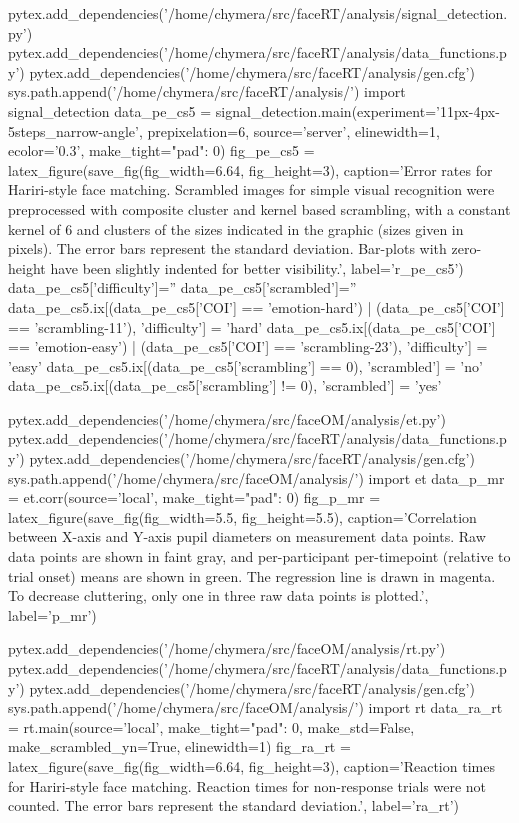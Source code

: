 \begin{pycode}[pe_cs5]
pytex.add_dependencies('/home/chymera/src/faceRT/analysis/signal_detection.py')
pytex.add_dependencies('/home/chymera/src/faceRT/analysis/data_functions.py')
pytex.add_dependencies('/home/chymera/src/faceRT/analysis/gen.cfg')
sys.path.append('/home/chymera/src/faceRT/analysis/')
import signal_detection
data_pe_cs5 = signal_detection.main(experiment='11px-4px-5steps_narrow-angle', prepixelation=6, source='server', elinewidth=1, ecolor='0.3', make_tight={"pad": 0})
fig_pe_cs5 = latex_figure(save_fig(fig_width=6.64, fig_height=3), caption='Error rates for Hariri-style face matching. Scrambled images for simple visual recognition were preprocessed with composite cluster and kernel based scrambling, with a constant kernel of \SI{6}{\pixel} and clusters of the sizes indicated in the graphic (sizes given in pixels). The error bars represent the standard deviation. Bar-plots with zero-height have been slightly indented for better visibility.', label='r_pe_cs5')
data_pe_cs5['difficulty']=''
data_pe_cs5['scrambled']=''
data_pe_cs5.ix[(data_pe_cs5['COI'] == 'emotion-hard') | (data_pe_cs5['COI'] == 'scrambling-11'), 'difficulty'] = 'hard'
data_pe_cs5.ix[(data_pe_cs5['COI'] == 'emotion-easy') | (data_pe_cs5['COI'] == 'scrambling-23'), 'difficulty'] = 'easy'
data_pe_cs5.ix[(data_pe_cs5['scrambling'] == 0), 'scrambled'] = 'no'
data_pe_cs5.ix[(data_pe_cs5['scrambling'] != 0), 'scrambled'] = 'yes'
\end{pycode}
\begin{pycode}[p_mr]
pytex.add_dependencies('/home/chymera/src/faceOM/analysis/et.py')
pytex.add_dependencies('/home/chymera/src/faceRT/analysis/data_functions.py')
pytex.add_dependencies('/home/chymera/src/faceRT/analysis/gen.cfg')
sys.path.append('/home/chymera/src/faceOM/analysis/')
import et
data_p_mr = et.corr(source='local', make_tight={"pad": 0})
fig_p_mr = latex_figure(save_fig(fig_width=5.5, fig_height=5.5), caption='Correlation between X-axis and Y-axis pupil diameters on measurement data points. Raw data points are shown in faint gray, and per-participant per-timepoint (relative to trial onset) means are shown in green. The regression line is drawn in magenta. To decrease cluttering, only one in three raw data points is plotted.', label='p_mr')
\end{pycode}
\begin{pycode}[ra_rt]
pytex.add_dependencies('/home/chymera/src/faceOM/analysis/rt.py')
pytex.add_dependencies('/home/chymera/src/faceRT/analysis/data_functions.py')
pytex.add_dependencies('/home/chymera/src/faceRT/analysis/gen.cfg')
sys.path.append('/home/chymera/src/faceOM/analysis/')
import rt
data_ra_rt = rt.main(source='local', make_tight={"pad": 0}, make_std=False, make_scrambled_yn=True, elinewidth=1)
fig_ra_rt = latex_figure(save_fig(fig_width=6.64, fig_height=3), caption='Reaction times for Hariri-style face matching. Reaction times for non-response trials were not counted. The error bars represent the standard deviation.', label='ra_rt')
\end{pycode}
